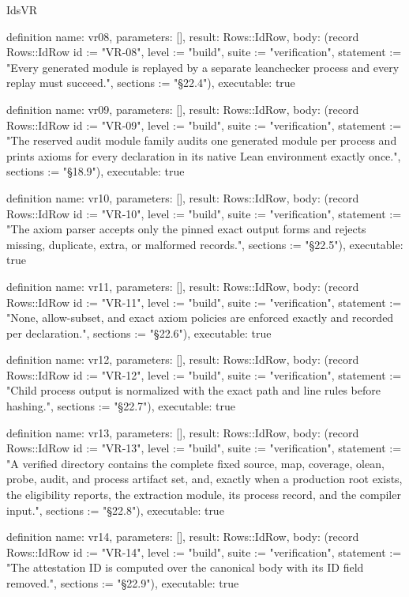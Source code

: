 \begin{lexlean}{IdsVR}
\begin{semanticmodule}
definition{
  name: vr08,
  parameters: [],
  result: Rows::IdRow,
  body: (record Rows::IdRow {id := "VR-08", level := "build", suite := "verification", statement := "Every generated module is replayed by a separate leanchecker process and every replay must succeed.", sections := "§22.4"}),
  executable: true
}

definition{
  name: vr09,
  parameters: [],
  result: Rows::IdRow,
  body: (record Rows::IdRow {id := "VR-09", level := "build", suite := "verification", statement := "The reserved audit module family audits one generated module per process and prints axioms for every declaration in its native Lean environment exactly once.", sections := "§18.9"}),
  executable: true
}

definition{
  name: vr10,
  parameters: [],
  result: Rows::IdRow,
  body: (record Rows::IdRow {id := "VR-10", level := "build", suite := "verification", statement := "The axiom parser accepts only the pinned exact output forms and rejects missing, duplicate, extra, or malformed records.", sections := "§22.5"}),
  executable: true
}

definition{
  name: vr11,
  parameters: [],
  result: Rows::IdRow,
  body: (record Rows::IdRow {id := "VR-11", level := "build", suite := "verification", statement := "None, allow-subset, and exact axiom policies are enforced exactly and recorded per declaration.", sections := "§22.6"}),
  executable: true
}

definition{
  name: vr12,
  parameters: [],
  result: Rows::IdRow,
  body: (record Rows::IdRow {id := "VR-12", level := "build", suite := "verification", statement := "Child process output is normalized with the exact path and line rules before hashing.", sections := "§22.7"}),
  executable: true
}

definition{
  name: vr13,
  parameters: [],
  result: Rows::IdRow,
  body: (record Rows::IdRow {id := "VR-13", level := "build", suite := "verification", statement := "A verified directory contains the complete fixed source, map, coverage, olean, probe, audit, and process artifact set, and, exactly when a production root exists, the eligibility reports, the extraction module, its process record, and the compiler input.", sections := "§22.8"}),
  executable: true
}

definition{
  name: vr14,
  parameters: [],
  result: Rows::IdRow,
  body: (record Rows::IdRow {id := "VR-14", level := "build", suite := "verification", statement := "The attestation ID is computed over the canonical body with its ID field removed.", sections := "§22.9"}),
  executable: true
}


\end{semanticmodule}
\end{lexlean}
